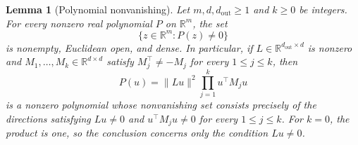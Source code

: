 \documentclass[mlmain]{jmlr}
\newtheorem{mylemma}{Lemma}
\begin{document}
\begin{mylemma}[Polynomial nonvanishing]
\label{lem:usable-directions}
Let $m,d,d_{\mathrm{out}}\ge1$ and $k\ge0$ be integers.  For every
nonzero real polynomial $P$ on $\mathbb R^m$, the set
\begin{equation}
 \{z\in\mathbb R^m:P(z)\ne0\}
 \label{eq:polynomial-nonvanishing-set}
\end{equation}
is nonempty, Euclidean open, and dense.  In particular, if
$L\in\mathbb R^{d_{\mathrm{out}}\times d}$ is nonzero and
$M_1,\ldots,M_k\in\mathbb R^{d\times d}$ satisfy
$M_j^\top\ne-M_j$ for every $1\le j\le k$, then
\begin{equation}
 P(u)=\|Lu\|^2\prod_{j=1}^k u^\top M_j u
 \label{eq:usable-directions-polynomial}
\end{equation}
is a nonzero polynomial whose nonvanishing set consists precisely of the
directions satisfying $Lu\ne0$ and $u^\top M_j u\ne0$ for every
$1\le j\le k$.  For $k=0$, the product is one, so the conclusion concerns
only the condition $Lu\ne0$.
\end{mylemma}
\end{document}
